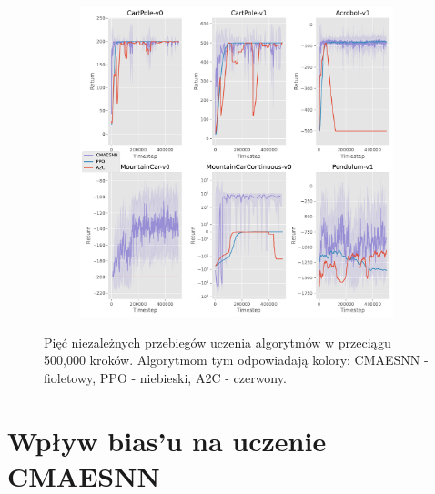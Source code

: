 \documentclass[12pt,a4paper]{article}
\begin{document}
\begin{figure}[ht!]
  \begin{subfigure}[ht!]{0.35\textwidth}
    \includegraphics[width=\textwidth]{../plotting/plots/plot_all4.pdf}
    \caption{}
  \end{subfigure}
  \caption{Pięć niezależnych przebiegów uczenia algorytmów w przeciągu 500,000 kroków.
    Algorytmom tym odpowiadają kolory: CMAESNN - fioletowy, PPO - niebieski,
    A2C - czerwony.}
  \label{}

\end{figure}

\pagebreak
\section{Wpływ bias'u na uczenie CMAESNN}
\end{document}
